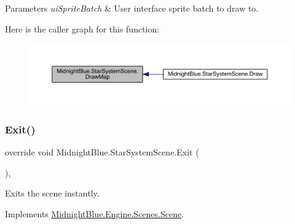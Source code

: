 \begin{DoxyParams}{Parameters}
{\em ui\+Sprite\+Batch} & User interface sprite batch to draw to.\\
\hline
\end{DoxyParams}
Here is the caller graph for this function\+:
\nopagebreak
\begin{figure}[H]
\begin{center}
\leavevmode
\includegraphics[width=350pt]{class_midnight_blue_1_1_star_system_scene_a8ce5e552f65d43e0326644e069dc6c24_icgraph}
\end{center}
\end{figure}
\hypertarget{class_midnight_blue_1_1_star_system_scene_ad533ba93e597964d015099031a85cb77}{}\label{class_midnight_blue_1_1_star_system_scene_ad533ba93e597964d015099031a85cb77} 
\subsubsection{\texorpdfstring{Exit()}{Exit()}}
{\footnotesize\ttfamily override void Midnight\+Blue.\+Star\+System\+Scene.\+Exit (\begin{DoxyParamCaption}{ }\end{DoxyParamCaption})\hspace{0.3cm}{\ttfamily [inline]}, {\ttfamily [virtual]}}



Exits the scene instantly. 



Implements \hyperlink{class_midnight_blue_1_1_engine_1_1_scenes_1_1_scene_adbf0f6d758df9fc5e20f24f327599e67}{Midnight\+Blue.\+Engine.\+Scenes.\+Scene}.

\hypertarget{class_midnight_blue_1_1_star_system_scene_a9fd64901322082a4da8658650257163d}{}\label{class_midnight_blue_1_1_star_system_scene_a9fd64901322082a4da8658650257163d} 
